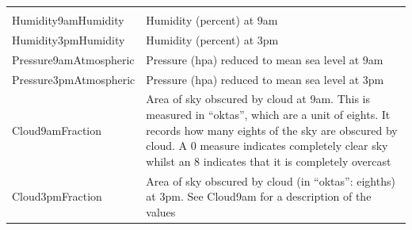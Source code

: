 \begin{longtable}[]{@{}ll@{}}
\begin{minipage}[t]{0.43\columnwidth}
\end{minipage}\tabularnewline
\begin{minipage}[t]{0.52\columnwidth}\raggedright
Humidity9amHumidity\strut
\end{minipage} & \begin{minipage}[t]{0.43\columnwidth}\raggedright
Humidity (percent) at 9am\strut
\end{minipage}\tabularnewline
\begin{minipage}[t]{0.52\columnwidth}\raggedright
Humidity3pmHumidity\strut
\end{minipage} & \begin{minipage}[t]{0.43\columnwidth}\raggedright
Humidity (percent) at 3pm\strut
\end{minipage}\tabularnewline
\begin{minipage}[t]{0.52\columnwidth}\raggedright
Pressure9amAtmospheric\strut
\end{minipage} & \begin{minipage}[t]{0.43\columnwidth}\raggedright
Pressure (hpa) reduced to mean sea level at 9am\strut
\end{minipage}\tabularnewline
\begin{minipage}[t]{0.52\columnwidth}\raggedright
Pressure3pmAtmospheric\strut
\end{minipage} & \begin{minipage}[t]{0.43\columnwidth}\raggedright
Pressure (hpa) reduced to mean sea level at 3pm\strut
\end{minipage}\tabularnewline
\begin{minipage}[t]{0.52\columnwidth}\raggedright
Cloud9amFraction\strut
\end{minipage} & \begin{minipage}[t]{0.43\columnwidth}\raggedright
Area of sky obscured by cloud at 9am. This is measured in ``oktas'',
which are a unit of eights. It records how many eights of the sky are
obscured by cloud. A 0 measure indicates completely clear sky whilst an
8 indicates that it is completely overcast\strut
\end{minipage}\tabularnewline
\begin{minipage}[t]{0.52\columnwidth}\raggedright
Cloud3pmFraction\strut
\end{minipage} & \begin{minipage}[t]{0.43\columnwidth}\raggedright
Area of sky obscured by cloud (in ``oktas'': eighths) at 3pm. See
Cloud9am for a description of the values\strut
\end{minipage}\tabularnewline

\end{longtable}

